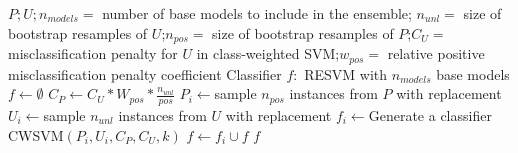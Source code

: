 \documentclass{article}
\begin{document}
\begin{algorithm}[!h]
\renewcommand{\algorithmicrequire}{\textbf{Input:}} %
\renewcommand{\algorithmicensure}{\textbf{Output:}} %
	\caption{RESVM} %
	\begin{algorithmic}[1] %
	    \REQUIRE
	    $P;U;n_{models}=$ number of base models to include in the ensemble;  $n_{unl}=$ size of bootstrap resamples of $U$;$n_{pos}=$ size of bootstrap resamples of $P$;$C_{U}=$ misclassification penalty for $U$ in class-weighted SVM;$w_{pos}=$ relative positive misclassification penalty coefficient
        \ENSURE
	    Classifier $f:$ RESVM with $n_{models}$ base models \\
	    \STATE $f\leftarrow \emptyset$
	    \STATE $C_P\leftarrow C_U*W_{pos}*\frac{n_{unl}}{pos}$
	    \STATE $P_i\leftarrow$sample $n_{pos}$ instances from $P$ with replacement
	    \STATE $U_i\leftarrow$sample $n_{unl}$ instances from $U$ with replacement
	    \STATE $f_i\leftarrow$Generate a classifier CWSVM$(P_i,U_i,C_P,C_U,k)$
	    \STATE $f\leftarrow f_i\cup f$
	    \ENDFOR
		\RETURN $f$
	\end{algorithmic}
\end{algorithm}
\end{document}
